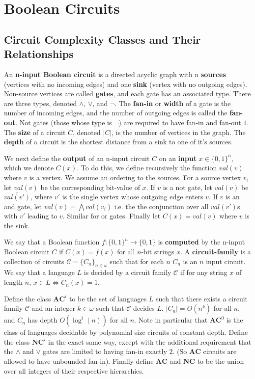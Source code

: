 \section{Boolean Circuits}
\subsection{Circuit Complexity Classes and Their Relationships}
\begin{definition}
	An \textbf{n-input Boolean circuit} is a directed acyclic graph with n \textbf{sources} (vertices with no incoming edges) and one \textbf{sink} (vertex with no outgoing edges). Non-source vertices are called \textbf{gates}, and each gate has an associated type. There are three types, denoted $\wedge$, $\vee$, and $\neg$. The \textbf{fan-in} or \textbf{width} of a gate is the number of incoming edges, and the number of outgoing edges is called the \textbf{fan-out}. Not gates (those whose type is $\neg$) are required to have fan-in and fan-out $1$. The \textbf{size} of a circuit $C$, denoted $|C|$, is the number of vertices in the graph. The \textbf{depth} of a circuit is the shortest distance from a sink to one of it's sources. \par 
	We next define the \textbf{output} of an  n-input circuit $C$ on an \textbf{input} $x \in \{0,1\}^n$, which we denote $C(x)$. To do this, we define recursively the function $val(v)$ where $v$ is a vertex. We assume an ordering to the sources. For a source vertex $v$, let $val(v)$ be the corresponding bit-value of $x$. If $v$ is a not gate, let $val(v)$ be $\bar{val(v')}$, where $v'$ is the single vertex whose outgoing edge enters $v$. If $v$ is an and gate, let $val(v) = \bigwedge val(v_i)$ i.e. the the conjunction over all $val(v')$s with $v'$ leading to $v$. Similar for or gates. Finally let $C(x) = val(v)$ where $v$ is the sink. \par 
	We say that a Boolean function $f:\{0,1\}^n \to \{0,1\}$ is \textbf{computed} by the n-input Boolean circuit $C$ if $C(x) = f(x)$ for all $n$-bit strings $x$. A \textbf{circuit-family} is a collection of circuits $\mathcal{C} = \{C_n\}_{n \in \omega}$ such that for each $n$ $C_n$ is an $n$ input circuit. We say that a language $L$ is decided by a circuit family $\mathcal{C}$ if for any string $x$ of length $n$, $x \in L \iff C_n(x) = 1$. \par 
	Define the class $\bm{AC}^i$ to be the set of languages $L$ such that there exists a circuit family $\mathcal{C}$ and an integer $k \in \omega$ such that $\mathcal{C}$ decides $L$, $|C_n| = O(n^k)$ for all $n$, and $C_n$ has depth $O(\log^i(n))$ for all $n$. Note in particular that $\bm{AC}^0$ is the class of languages decidable by polynomial size circuits of constant depth. Define the class $\bm{NC}^i$ in the exact same way, except with the additional requirement that the $\wedge$ and $\vee$ gates are limited to having fan-in exactly $2$. (So $\bm{AC}$ circuits are allowed to have unbounded fan-in). Finally define $\bm{AC}$ and $\bm{NC}$ to be the union over all integers of their respective hierarchies. 
\end{definition}
